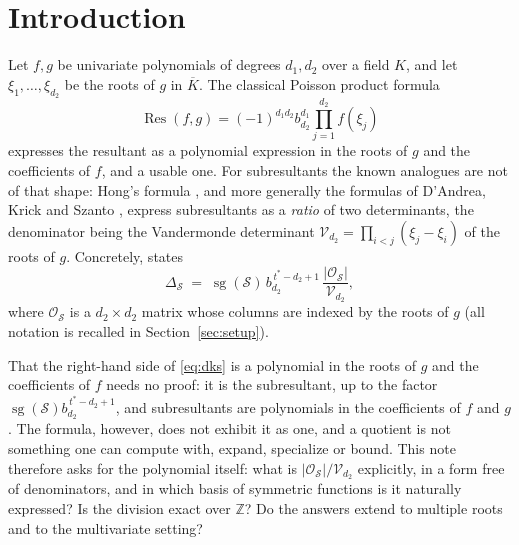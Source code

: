 \documentclass[11pt,reqno]{amsart}
\theoremstyle{plain}
\theoremstyle{definition}
\DeclareMathOperator{\Res}{Res}
\DeclareMathOperator{\sg}{sg}
\newcommand{\cO}{\mathcal{O}}
\newcommand{\cS}{\mathcal{S}}
\newcommand{\cV}{\mathcal{V}}
\newcommand{\ZZ}{\mathbb{Z}}
\begin{document}
\section{Introduction}

Let $f,g$ be univariate polynomials of degrees $d_1,d_2$ over a field $K$, and
let $\xi_1,\dots,\xi_{d_2}$ be the roots of $g$ in $\overline{K}$. The classical
Poisson product formula
\[
  \Res(f,g)=(-1)^{d_1d_2}b_{d_2}^{d_1}\prod_{j=1}^{d_2}f(\xi_j)
\]
expresses the resultant as a polynomial expression in the roots of $g$ and the
coefficients of $f$, and a usable one. For subresultants the known analogues are
not of that shape:
Hong's formula \cite{Hong}, and more generally the formulas of D'Andrea, Krick
and Szanto \cite{DKS05}, express subresultants as a \emph{ratio} of two
determinants, the denominator being the Vandermonde determinant
$\cV_{d_2}=\prod_{i<j}(\xi_j-\xi_i)$ of the roots of $g$. Concretely,
\cite[Thm.~2.2]{DKS05} states
\begin{equation}\label{eq:dks}
  \Delta_\cS \;=\; \sg(\cS)\, b_{d_2}^{\,t^*-d_2+1}\,
  \frac{|\cO_\cS|}{\cV_{d_2}},
\end{equation}
where $\cO_\cS$ is a $d_2\times d_2$ matrix whose columns are indexed by the
roots of $g$ (all notation is recalled in Section~\ref{sec:setup}).

That the right-hand side of \eqref{eq:dks} is a polynomial in the roots of $g$ and
the coefficients of $f$ needs no proof: it is the subresultant, up to the factor
$\sg(\cS)b_{d_2}^{\,t^*-d_2+1}$, and subresultants are polynomials in the
coefficients of $f$ and $g$. The formula, however, does not exhibit it as one, and
a quotient is not something one can compute with, expand, specialize or bound.
This note therefore asks for the polynomial itself: what is
$|\cO_\cS|/\cV_{d_2}$ explicitly, in a form free of denominators, and in which
basis of symmetric functions is it naturally expressed? Is the division exact over
$\ZZ$? Do the answers extend to multiple roots and to the multivariate setting?
\end{document}
